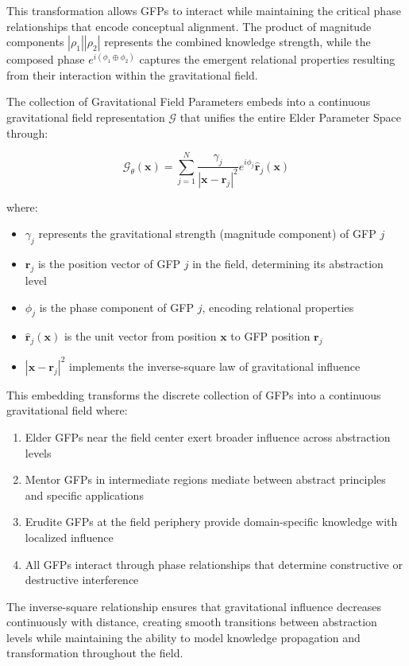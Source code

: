 This transformation allows GFPs to interact while maintaining the critical phase relationships that encode conceptual alignment. The product of magnitude components $|\rho_1||\rho_2|$ represents the combined knowledge strength, while the composed phase $e^{i(\phi_1 \oplus \phi_2)}$ captures the emergent relational properties resulting from their interaction within the gravitational field.

\begin{theorem}
The collection of Gravitational Field Parameters embeds into a continuous gravitational field representation $\mathcal{G}$ that unifies the entire Elder Parameter Space through:

\begin{equation}
\mathcal{G}_{\theta}(\mathbf{x}) = \sum_{j=1}^N \frac{\gamma_j}{|\mathbf{x} - \mathbf{r}_j|^2} e^{i\phi_j} \hat{\mathbf{r}}_j(\mathbf{x})
\end{equation}

where:
\begin{itemize}
    \item $\gamma_j$ represents the gravitational strength (magnitude component) of GFP $j$
    \item $\mathbf{r}_j$ is the position vector of GFP $j$ in the field, determining its abstraction level
    \item $\phi_j$ is the phase component of GFP $j$, encoding relational properties
    \item $\hat{\mathbf{r}}_j(\mathbf{x})$ is the unit vector from position $\mathbf{x}$ to GFP position $\mathbf{r}_j$
    \item $|\mathbf{x} - \mathbf{r}_j|^2$ implements the inverse-square law of gravitational influence
\end{itemize}

This embedding transforms the discrete collection of GFPs into a continuous gravitational field where:
\begin{enumerate}
    \item Elder GFPs near the field center exert broader influence across abstraction levels
    \item Mentor GFPs in intermediate regions mediate between abstract principles and specific applications
    \item Erudite GFPs at the field periphery provide domain-specific knowledge with localized influence
    \item All GFPs interact through phase relationships that determine constructive or destructive interference
\end{enumerate}

The inverse-square relationship ensures that gravitational influence decreases continuously with distance, creating smooth transitions between abstraction levels while maintaining the ability to model knowledge propagation and transformation throughout the field.
\end{theorem}

